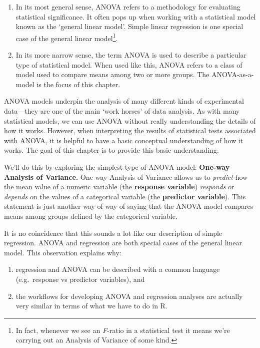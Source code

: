 \documentclass[
]{book}
\providecommand{\tightlist}{%
  \setlength{\itemsep}{0pt}\setlength{\parskip}{0pt}}
\begin{document}
\begin{enumerate}
\def\labelenumi{\arabic{enumi}.}
\tightlist
\item
  In its most general sense, ANOVA refers to a methodology for evaluating statistical significance. It often pops up when working with a statistical model known as the `general linear model'. Simple linear regression is one special case of the general linear model\footnote{In fact, whenever we see an \emph{F}-ratio in a statistical test it means we're carrying out an Analysis of Variance of some kind.}.
\item
  In its more narrow sense, the term ANOVA is used to describe a particular type of statistical model. When used like this, ANOVA refers to a class of model used to compare means among two or more groups. The ANOVA-as-a-model is the focus of this chapter.
\end{enumerate}

ANOVA models underpin the analysis of many different kinds of experimental data---they are one of the main `work horses' of data analysis. As with many statistical models, we can use ANOVA without really understanding the details of how it works. However, when interpreting the results of statistical tests associated with ANOVA, it is helpful to have a basic conceptual understanding of how it works. The goal of this chapter is to provide this basic understanding.

We'll do this by exploring the simplest type of ANOVA model: \textbf{One-way Analysis of Variance.} One-way Analysis of Variance allows us to \emph{predict} how the mean value of a numeric variable (the \textbf{response variable}) \emph{responds} or \emph{depends} on the values of a categorical variable (the \textbf{predictor variable}). This statement is just another way of way of saying that the ANOVA model compares means among groups defined by the categorical variable.

It is no coincidence that this sounds a lot like our description of simple regression. ANOVA and regression are both special cases of the general linear model. This observation explains why:

\begin{enumerate}
\def\labelenumi{\arabic{enumi}.}
\tightlist
\item
  regression and ANOVA can be described with a common language (e.g.~response vs predictor variables), and
\item
  the workflows for developing ANOVA and regression analyses are actually very similar in terms of what we have to do in R.
\end{enumerate}
\end{document}
